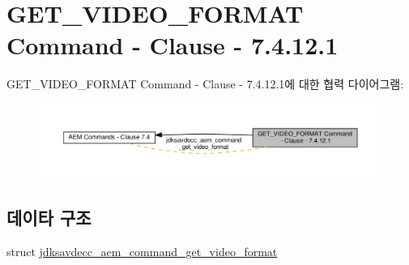 \hypertarget{group__command__get__video__format}{}\section{G\+E\+T\+\_\+\+V\+I\+D\+E\+O\+\_\+\+F\+O\+R\+M\+AT Command -\/ Clause -\/ 7.4.12.1}
\label{group__command__get__video__format}
G\+E\+T\+\_\+\+V\+I\+D\+E\+O\+\_\+\+F\+O\+R\+M\+AT Command -\/ Clause -\/ 7.4.12.1에 대한 협력 다이어그램\+:
\nopagebreak
\begin{figure}[H]
\begin{center}
\leavevmode
\includegraphics[width=350pt]{group__command__get__video__format}
\end{center}
\end{figure}
\subsection*{데이타 구조}
\begin{DoxyCompactItemize}
\item 
struct \hyperlink{structjdksavdecc__aem__command__get__video__format}{jdksavdecc\+\_\+aem\+\_\+command\+\_\+get\+\_\+video\+\_\+format}
\end{DoxyCompactItemize}
